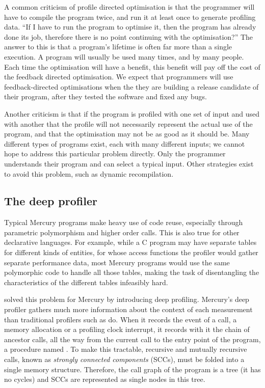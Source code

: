 
A common criticism of profile directed optimisation is that the programmer will
have to compile the program twice,
and run it at least once to generate profiling data.
``If I have to run the program to optimise it, then the program has
already done its job,
therefore there is no point continuing with the optimisation?''
The answer to this is that a program's lifetime is often far more than a
single execution.
A program will usually be used many times, and by many people.
Each time the optimisation will have a benefit,
this benefit will pay off the cost of the feedback directed optimisation.
We expect that programmers will use feedback-directed optimisations when the
they are building a release candidate of their program,
after they tested the software and fixed any bugs.

Another criticism is that if the program is profiled with one set of input and
used with another that the profile will not necessarily represent the actual use
of the program,
and that the optimisation may not be as good as it should be.
Many different types of programs exist, each with many different inputs;
we cannot hope to address this particular problem directly.
Only the programmer understands their program and can select a typical
input.
Other strategies exist to avoid this problem,
such as dynamic recompilation.

\subsection{The deep profiler}
\label{sec:backgnd_deep}

Typical Mercury programs make heavy use of code reuse,
especially through parametric polymorphism and higher order calls.
This is also true for other declarative languages.
For example, while a C program may have
separate tables for different kinds of entities,
for whose access functions
the profiler would gather separate performance data,
most Mercury programs would use
the same polymorphic code to handle all those tables,
making the task of disentangling the characteristics of the different tables
infeasibly hard.

\citep{conway:2001:mercury-deep}
solved this problem for Mercury by introducing deep profiling.
Mercury's deep profiler gathers much more information about the context of
each measurement than traditional profilers such as  \citep{gprof} do.
When it records the event of a call,
a memory allocation or a profiling clock interrupt,
it records with it the chain of ancestor calls,
all the way from the current call to the entry point of the program,
a procedure named .
To make this tractable,
recursive and mutually recursive calls,
known as \emph{strongly connected components} (SCCs),
must be folded into a single memory structure.
Therefore, the call graph of the program is a tree (it has no cycles)
and SCCs are represented as single nodes in this tree.

